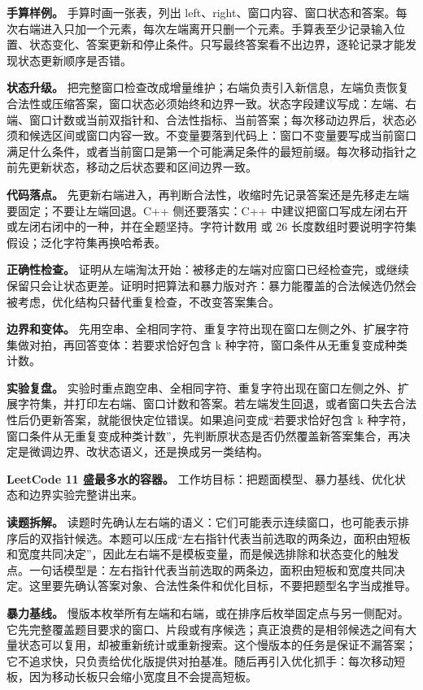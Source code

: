 \textbf{手算样例。} 手算时画一张表，列出 left、right、窗口内容、窗口状态和答案。每次右端进入只加一个元素，每次左端离开只删一个元素。手算表至少记录输入位置、状态变化、答案更新和停止条件。只写最终答案看不出边界，逐轮记录才能发现状态更新顺序是否错。

\textbf{状态升级。} 把完整窗口检查改成增量维护；右端负责引入新信息，左端负责恢复合法性或压缩答案，窗口状态必须始终和边界一致。状态字段建议写成：左端、右端、窗口计数或当前双指针和、合法性指标、当前答案；每次移动边界后，状态必须和候选区间或窗口内容一致。不变量要落到代码上：窗口不变量要写成当前窗口满足什么条件，或者当前窗口是第一个可能满足条件的最短前缀。每次移动指针之前先更新状态，移动之后状态要和区间边界一致。

\textbf{代码落点。} 先更新右端进入，再判断合法性，收缩时先记录答案还是先移走左端要固定；不要让左端回退。C++ 侧还要落实：C++ 中建议把窗口写成左闭右开或左闭右闭中的一种，并在全题坚持。字符计数用  或 26 长度数组时要说明字符集假设；泛化字符集再换哈希表。

\textbf{正确性检查。} 证明从左端淘汰开始：被移走的左端对应窗口已经检查完，或继续保留只会让状态更差。证明时把算法和暴力版对齐：暴力能覆盖的合法候选仍然会被考虑，优化结构只替代重复检查，不改变答案集合。

\textbf{边界和变体。} 先用空串、全相同字符、重复字符出现在窗口左侧之外、扩展字符集做对拍，再回答变体：若要求恰好包含 k 种字符，窗口条件从无重复变成种类计数。

\textbf{实验复盘。} 实验时重点跑空串、全相同字符、重复字符出现在窗口左侧之外、扩展字符集，并打印左右端、窗口计数和答案。若左端发生回退，或者窗口失去合法性后仍更新答案，就能很快定位错误。如果追问变成“若要求恰好包含 k 种字符，窗口条件从无重复变成种类计数”，先判断原状态是否仍然覆盖新答案集合，再决定是微调边界、改状态语义，还是换成另一类结构。

\noindent\textbf{LeetCode 11 盛最多水的容器。} 工作坊目标：把题面模型、暴力基线、优化状态和边界实验完整讲出来。

\textbf{读题拆解。} 读题时先确认左右端的语义：它们可能表示连续窗口，也可能表示排序后的双指针候选。本题可以压成“左右指针代表当前选取的两条边，面积由短板和宽度共同决定”，因此左右端不是模板变量，而是候选排除和状态变化的触发点。一句话模型是：左右指针代表当前选取的两条边，面积由短板和宽度共同决定。这里要先确认答案对象、合法性条件和优化目标，不要把题型名字当成推导。

\textbf{暴力基线。} 慢版本枚举所有左端和右端，或在排序后枚举固定点与另一侧配对。它先完整覆盖题目要求的窗口、片段或有序候选；真正浪费的是相邻候选之间有大量状态可以复用，却被重新统计或重新搜索。这个慢版本的任务是保证不漏答案；它不追求快，只负责给优化版提供对拍基准。随后再引入优化抓手：每次移动短板，因为移动长板只会缩小宽度且不会提高短板。

